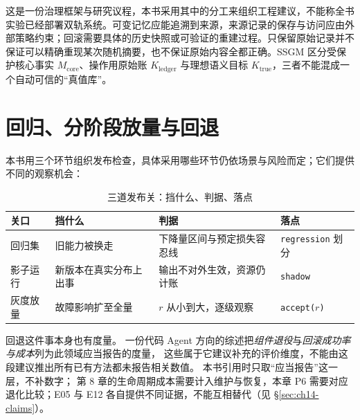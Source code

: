 \begin{sloppypar}
这是一份治理框架与研究议程，本书采用其中的分工来组织工程建议，不能称全书实验已经部署双轨系统。可变记忆应能追溯到来源，来源记录的保存与访问应由外部策略约束；回滚需要具体的历史快照或可验证的重建过程。只保留原始记录并不保证可以精确重现某次随机摘要，也不保证原始内容全都正确。SSGM 区分受保护核心事实 $M_{\mathrm{core}}$、操作用原始账 $K_{\mathrm{ledger}}$ 与理想语义目标 $K_{\mathrm{true}}$，三者不能混成一个自动可信的“真值库”\cite{ssgm-2603}。
\end{sloppypar}

\section{回归、分阶段放量与回退}
\label{sec:ch14-rollback}

\begin{sloppypar}
本书用三个环节组织发布检查，具体采用哪些环节仍依场景与风险而定；它们提供不同的观察机会：
\end{sloppypar}

\begin{table}[htbp]
\centering
\caption{三道发布关：挡什么、判据、落点}
\label{tab:ch14-gate}
\begin{tabular}{>{\raggedright\arraybackslash}p{2.4cm}>{\raggedright\arraybackslash}p{3.8cm}>{\raggedright\arraybackslash}p{4.4cm}>{\raggedright\arraybackslash}p{2.8cm}}
\toprule
关口 & 挡什么 & 判据 & 落点 \\
\midrule
回归集 & 旧能力被换走 & 下降量区间与预定损失容忍线 & \texttt{regression} 划分 \\
\midrule
影子运行 & 新版本在真实分布上出事 & 输出不对外生效，资源仍计账 & \texttt{shadow} \\
\midrule
灰度放量 & 故障影响扩至全量 & $r$ 从小到大，逐级观察 & \texttt{accept($r$)} \\
\bottomrule
\end{tabular}
\end{table}

\begin{sloppypar}
回退这件事本身也有度量。
一份代码 Agent 方向的综述\cite{coding-survey-2608}把\emph{组件退役}与\emph{回滚成功率与成本}列为此领域应当报告的度量，
这些属于它建议补充的评价维度，不能由这段建议推出所有已有方法都未报告相关数值。
本书引用时只取“应当报告”这一层，不补数字；
第 8 章的生命周期成本需要计入维护与恢复，本章 P6 需要对应退化比较；E05 与 E12 各自提供不同证据，不能互相替代（见 \S\ref{sec:ch14-claims}）。
\end{sloppypar}

